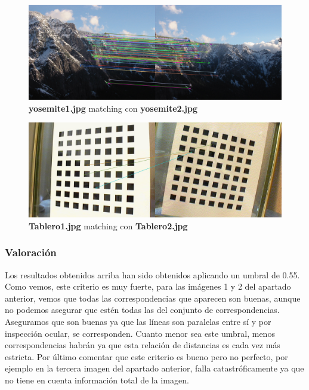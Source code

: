 \documentclass{article}
\begin{document}
\begin{figure}[hbt!]
	\centering
	\includegraphics[width=1.0\textwidth]{../assets/Ejercicio2-Lowe_criteria-2.png}
	\caption{\textbf{yosemite1.jpg} matching con \textbf{yosemite2.jpg}}
\end{figure}
\newpage
\begin{figure}[hbt!]
	\centering
	\includegraphics[width=1.0\textwidth]{../assets/Ejercicio2-Lowe_criteria-3.png}
	\caption{\textbf{Tablero1.jpg} matching con \textbf{Tablero2.jpg}}
\end{figure}

\subsubsection{Valoración}
Los resultados obtenidos arriba han sido obtenidos aplicando un umbral de 0.55.\newline
Como vemos, este criterio es muy fuerte, para las imágenes 1 y 2 del apartado anterior, vemos que todas las correspondencias que aparecen son buenas, aunque no podemos asegurar que estén todas las del conjunto de correspondencias. Aseguramos que son buenas ya que las líneas son paralelas entre sí y por inspección ocular, se corresponden.
\newline
Cuanto menor sea este umbral, menos correspondencias habrán ya que esta relación de distancias es cada vez más estricta.
\newline
Por último comentar que este criterio es bueno pero no perfecto, por ejemplo en la tercera imagen del apartado anterior, falla catastróficamente ya que no tiene en cuenta información total de la imagen. 
\end{document}
